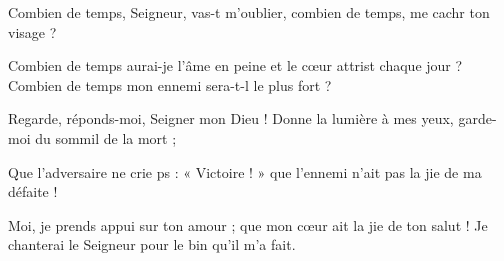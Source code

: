 \item Combien de temps, Seigneur, vas-t m’oublier,\psstar{} combien de temps, me cachr ton visage ?
\item Combien de temps aurai-je l’âme en peine et le cœur attrist chaque jour ?\psstar{} Combien de temps mon ennemi sera-t-l le plus fort ?
\item Regarde, réponds-moi, Seigner mon Dieu !\psstar{} Donne la lumière à mes yeux, garde-moi du sommil de la mort ;
\item Que l’adversaire ne crie ps : « Victoire ! »\psstar{} que l’ennemi n’ait pas la jie de ma défaite !
\item Moi, je prends appui sur ton amour ;\pscross{} que mon cœur ait la jie de ton salut !\psstar{} Je chanterai le Seigneur pour le bin qu’il m’a fait.